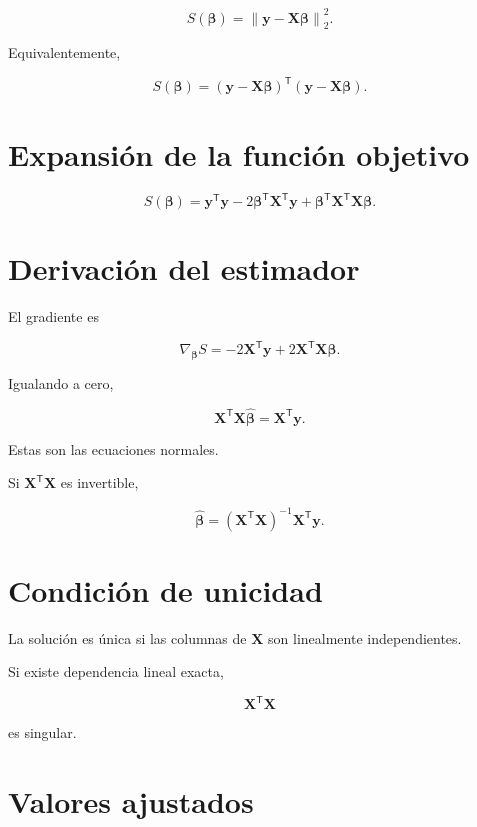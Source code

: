 \documentclass[
  spanish,
  11pt,
  letterpaper,
  DIV=11,
  numbers=noendperiod]{scrreprt}
\theoremstyle{definition}
\theoremstyle{plain}
\theoremstyle{definition}
\theoremstyle{remark}
\begin{document}
\[
S(\boldsymbol{\beta})
=
\left\|
\mathbf{y}
-
\mathbf{X}\boldsymbol{\beta}
\right\|_2^2.
\]

Equivalentemente,

\[
S(\boldsymbol{\beta})
=
(\mathbf{y}-\mathbf{X}\boldsymbol{\beta})^{\mathsf T}
(\mathbf{y}-\mathbf{X}\boldsymbol{\beta}).
\]

\section{Expansión de la función
objetivo}\label{expansiuxf3n-de-la-funciuxf3n-objetivo}

\[
S(\boldsymbol{\beta})
=
\mathbf{y}^{\mathsf T}\mathbf{y}
-
2\boldsymbol{\beta}^{\mathsf T}\mathbf{X}^{\mathsf T}\mathbf{y}
+
\boldsymbol{\beta}^{\mathsf T}
\mathbf{X}^{\mathsf T}\mathbf{X}
\boldsymbol{\beta}.
\]

\section{Derivación del estimador}\label{derivaciuxf3n-del-estimador}

El gradiente es

\[
\nabla_{\boldsymbol{\beta}}S
=
-2\mathbf{X}^{\mathsf T}\mathbf{y}
+
2\mathbf{X}^{\mathsf T}\mathbf{X}\boldsymbol{\beta}.
\]

Igualando a cero,

\[
\mathbf{X}^{\mathsf T}\mathbf{X}
\widehat{\boldsymbol{\beta}}
=
\mathbf{X}^{\mathsf T}\mathbf{y}.
\]

Estas son las ecuaciones normales.

Si \(\mathbf{X}^{\mathsf T}\mathbf{X}\) es invertible,

\[
\widehat{\boldsymbol{\beta}}
=
\left(
\mathbf{X}^{\mathsf T}\mathbf{X}
\right)^{-1}
\mathbf{X}^{\mathsf T}\mathbf{y}.
\]

\section{Condición de unicidad}\label{condiciuxf3n-de-unicidad}

La solución es única si las columnas de \(\mathbf{X}\) son linealmente
independientes.

Si existe dependencia lineal exacta,

\[
\mathbf{X}^{\mathsf T}\mathbf{X}
\]

es singular.

\section{Valores ajustados}\label{valores-ajustados}
\end{document}
